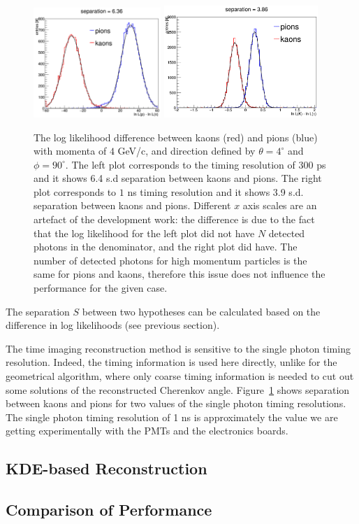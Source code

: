 \begin{figure}[!h]
\centering
\includegraphics[width=0.43\textwidth]{pics/sepTI300.png} \hspace{0.5cm} \includegraphics[width=0.52\textwidth]{pics/sepTI1000.png}
\caption{\label{pic:sepTI}
The log likelihood difference between kaons (red) and pions (blue) with momenta of $4$ GeV/c, and direction defined by $\theta = 4^{\circ}$ and $\phi = 90^{\circ}$. The left plot corresponds to the timing resolution of $300$ ps and it shows 6.4 s.d separation between kaons and pions. The right plot corresponds to $1$ ns timing resolution and it shows 3.9 s.d. separation between kaons and pions. \newline \footnotesize{Different $x$ axis scales are an artefact of the development work: the difference is due to the fact that the log likelihood for the left plot did not have $N$ detected photons in the denominator, and the right plot did have. The number of detected photons for high momentum particles is the same for pions and kaons, therefore this issue does not influence the performance for the given case. }
}
\end{figure}

The separation $S$ between two hypotheses can be calculated based on the difference in log likelihoods (see previous section).

The time imaging reconstruction method is sensitive to the single photon timing resolution. Indeed, the timing information is used here directly, unlike for the geometrical algorithm, where only coarse timing information is needed to cut out some solutions of the reconstructed Cherenkov angle. Figure~\ref{pic:sepTI} shows separation between kaons and pions for two values of the single photon timing resolutions. The single photon timing resolution of 1 ns is approximately the value we are getting experimentally with the PMTs and the electronics boards.

\subsection{KDE-based Reconstruction}

\subsection{Comparison of Performance}